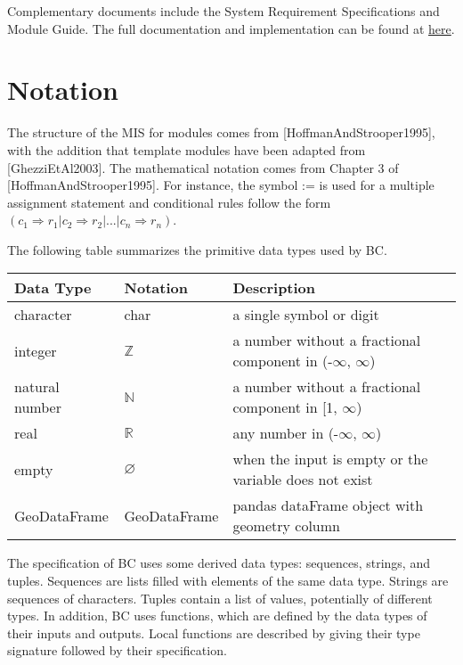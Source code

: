 \documentclass[12pt, titlepage]{article}
\begin{document}
Complementary documents include the System Requirement Specifications
and Module Guide.  The full documentation and implementation can be
found at \href{https://github.com/CynthiaLiu0805/BridgeCorrosion}{here}.

\section{Notation}


The structure of the MIS for modules comes from [HoffmanAndStrooper1995],
with the addition that template modules have been adapted from
[GhezziEtAl2003].  The mathematical notation comes from Chapter 3 of
[HoffmanAndStrooper1995].  For instance, the symbol := is used for a
multiple assignment statement and conditional rules follow the form $(c_1
\Rightarrow r_1 | c_2 \Rightarrow r_2 | ... | c_n \Rightarrow r_n )$.

The following table summarizes the primitive data types used by BC. 
\begin{center}
\renewcommand{\arraystretch}{1.2}
\noindent 
\begin{tabular}{l l p{7.5cm}} 
\toprule 
\textbf{Data Type} & \textbf{Notation} & \textbf{Description}\\ 
\midrule
character & char & a single symbol or digit\\
integer & $\mathbb{Z}$ & a number without a fractional component in (-$\infty$, $\infty$) \\
natural number & $\mathbb{N}$ & a number without a fractional component in [1, $\infty$) \\
real & $\mathbb{R}$ & any number in (-$\infty$, $\infty$)\\
empty & $\varnothing$ & when the input is empty or the variable does not exist \\
GeoDataFrame & GeoDataFrame &  pandas dataFrame object with geometry column\\
\bottomrule
\end{tabular} 
\end{center}

\noindent
The specification of BC uses some derived data types: sequences, strings, and
tuples. Sequences are lists filled with elements of the same data type. Strings
are sequences of characters. Tuples contain a list of values, potentially of
different types. In addition, BC uses functions, which
are defined by the data types of their inputs and outputs. Local functions are
described by giving their type signature followed by their specification.
\end{document}
